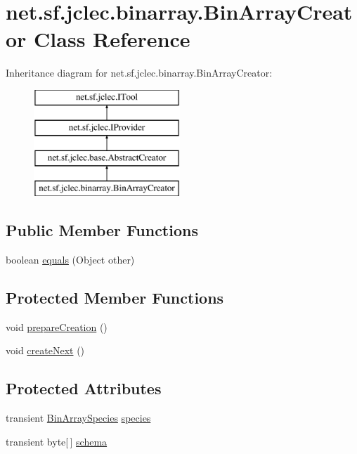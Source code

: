 \hypertarget{classnet_1_1sf_1_1jclec_1_1binarray_1_1_bin_array_creator}{\section{net.\-sf.\-jclec.\-binarray.\-Bin\-Array\-Creator Class Reference}
\label{classnet_1_1sf_1_1jclec_1_1binarray_1_1_bin_array_creator}
}
Inheritance diagram for net.\-sf.\-jclec.\-binarray.\-Bin\-Array\-Creator\-:\begin{figure}[H]
\begin{center}
\leavevmode
\includegraphics[height=4.000000cm]{classnet_1_1sf_1_1jclec_1_1binarray_1_1_bin_array_creator}
\end{center}
\end{figure}
\subsection*{Public Member Functions}
\begin{DoxyCompactItemize}
\item 
boolean \hyperlink{classnet_1_1sf_1_1jclec_1_1binarray_1_1_bin_array_creator_a2190fa73d1e2211dcf783d3b6a78f929}{equals} (Object other)
\end{DoxyCompactItemize}
\subsection*{Protected Member Functions}
\begin{DoxyCompactItemize}
\item 
void \hyperlink{classnet_1_1sf_1_1jclec_1_1binarray_1_1_bin_array_creator_a51d110d716e41756a37c508a5d92b478}{prepare\-Creation} ()
\item 
void \hyperlink{classnet_1_1sf_1_1jclec_1_1binarray_1_1_bin_array_creator_aff93b467bf15009d84d97e5427398985}{create\-Next} ()
\end{DoxyCompactItemize}
\subsection*{Protected Attributes}
\begin{DoxyCompactItemize}
\item 
transient \hyperlink{classnet_1_1sf_1_1jclec_1_1binarray_1_1_bin_array_species}{Bin\-Array\-Species} \hyperlink{classnet_1_1sf_1_1jclec_1_1binarray_1_1_bin_array_creator_a166ddebeaa80af211d1bb7c87786d7e7}{species}
\item 
transient byte\mbox{[}$\,$\mbox{]} \hyperlink{classnet_1_1sf_1_1jclec_1_1binarray_1_1_bin_array_creator_aaa529b1abd5a153760b138335d258926}{schema}
\end{DoxyCompactItemize}


